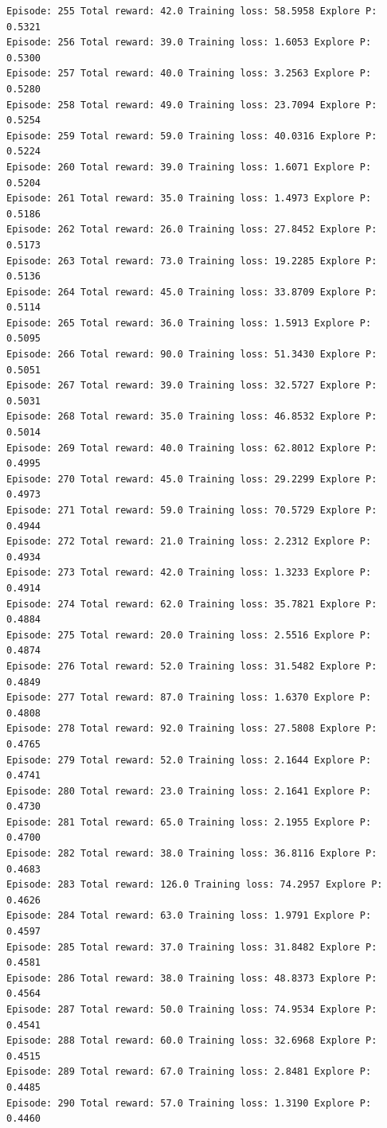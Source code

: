 \documentclass[11pt]{article}
\begin{document}
\begin{Verbatim}[commandchars=\\\{\}]
Episode: 255 Total reward: 42.0 Training loss: 58.5958 Explore P: 0.5321
Episode: 256 Total reward: 39.0 Training loss: 1.6053 Explore P: 0.5300
Episode: 257 Total reward: 40.0 Training loss: 3.2563 Explore P: 0.5280
Episode: 258 Total reward: 49.0 Training loss: 23.7094 Explore P: 0.5254
Episode: 259 Total reward: 59.0 Training loss: 40.0316 Explore P: 0.5224
Episode: 260 Total reward: 39.0 Training loss: 1.6071 Explore P: 0.5204
Episode: 261 Total reward: 35.0 Training loss: 1.4973 Explore P: 0.5186
Episode: 262 Total reward: 26.0 Training loss: 27.8452 Explore P: 0.5173
Episode: 263 Total reward: 73.0 Training loss: 19.2285 Explore P: 0.5136
Episode: 264 Total reward: 45.0 Training loss: 33.8709 Explore P: 0.5114
Episode: 265 Total reward: 36.0 Training loss: 1.5913 Explore P: 0.5095
Episode: 266 Total reward: 90.0 Training loss: 51.3430 Explore P: 0.5051
Episode: 267 Total reward: 39.0 Training loss: 32.5727 Explore P: 0.5031
Episode: 268 Total reward: 35.0 Training loss: 46.8532 Explore P: 0.5014
Episode: 269 Total reward: 40.0 Training loss: 62.8012 Explore P: 0.4995
Episode: 270 Total reward: 45.0 Training loss: 29.2299 Explore P: 0.4973
Episode: 271 Total reward: 59.0 Training loss: 70.5729 Explore P: 0.4944
Episode: 272 Total reward: 21.0 Training loss: 2.2312 Explore P: 0.4934
Episode: 273 Total reward: 42.0 Training loss: 1.3233 Explore P: 0.4914
Episode: 274 Total reward: 62.0 Training loss: 35.7821 Explore P: 0.4884
Episode: 275 Total reward: 20.0 Training loss: 2.5516 Explore P: 0.4874
Episode: 276 Total reward: 52.0 Training loss: 31.5482 Explore P: 0.4849
Episode: 277 Total reward: 87.0 Training loss: 1.6370 Explore P: 0.4808
Episode: 278 Total reward: 92.0 Training loss: 27.5808 Explore P: 0.4765
Episode: 279 Total reward: 52.0 Training loss: 2.1644 Explore P: 0.4741
Episode: 280 Total reward: 23.0 Training loss: 2.1641 Explore P: 0.4730
Episode: 281 Total reward: 65.0 Training loss: 2.1955 Explore P: 0.4700
Episode: 282 Total reward: 38.0 Training loss: 36.8116 Explore P: 0.4683
Episode: 283 Total reward: 126.0 Training loss: 74.2957 Explore P: 0.4626
Episode: 284 Total reward: 63.0 Training loss: 1.9791 Explore P: 0.4597
Episode: 285 Total reward: 37.0 Training loss: 31.8482 Explore P: 0.4581
Episode: 286 Total reward: 38.0 Training loss: 48.8373 Explore P: 0.4564
Episode: 287 Total reward: 50.0 Training loss: 74.9534 Explore P: 0.4541
Episode: 288 Total reward: 60.0 Training loss: 32.6968 Explore P: 0.4515
Episode: 289 Total reward: 67.0 Training loss: 2.8481 Explore P: 0.4485
Episode: 290 Total reward: 57.0 Training loss: 1.3190 Explore P: 0.4460

\end{Verbatim}
\end{document}

